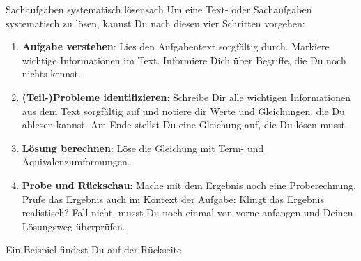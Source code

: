 \documentclass[12pt,a5paper,landscape]{scrartcl}
\begin{document}
\begin{hilfekarte}{Sachaufgaben systematisch lösen}{sach}
Um eine Text- oder Sachaufgaben systematisch zu lösen, kannst Du nach diesen vier Schritten vorgehen:
\begin{enumerate}
	\item \textbf{Aufgabe verstehen}: Lies den Aufgabentext sorgfältig durch. Markiere wichtige Informationen im Text. Informiere Dich über Begriffe, die Du noch nichts kennst.
	\item \textbf{(Teil-)Probleme identifizieren}: Schreibe Dir alle wichtigen Informationen aus dem Text sorgfältig auf und notiere dir Werte und Gleichungen, die Du ablesen kannst. Am Ende stellst Du eine Gleichung auf, die Du lösen musst.
	\item \textbf{Lösung berechnen}: Löse die Gleichung mit Term- und Äquivalenzumformungen.
	\item \textbf{Probe und Rückschau}: Mache mit dem Ergebnis noch eine Proberechnung. Prüfe das Ergebnis auch im Kontext der Aufgabe: Klingt das Ergebnis realistisch? Fall nicht, musst Du noch einmal von vorne anfangen und Deinen Lösungsweg überprüfen.
\end{enumerate}

Ein Beispiel findest Du auf der Rückseite.
\end{hilfekarte}
\end{document}
